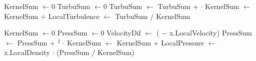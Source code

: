 \begin{center}
\begin{algorithmic}[1]
    \State KernelSum $\gets 0$
    \State TurbuSum $\gets 0$
        \State TurbuSum $\gets$ TurbuSum $+$  $\cdot$ 
        \State KernelSum $\gets$ KernelSum $+$ 
    \EndFor
    \State LocalTurbulence $\gets$ TurbuSum $/$ KernelSum
\EndFor

    \State KernelSum $\gets 0$
    \State PressSum $\gets 0$
        \State VelocityDif $\gets$ ( $-$ x.LocalVelocity)
        \State PressSum $\gets$ PressSum $+$ $^2$ $\cdot$ 
        \State KernelSum $\gets$ KernelSum $+$ 
    \EndFor
    \State LocalPressure $\gets$ x.LocalDensity $\cdot$ (PressSum $/$ KernelSum)
\EndFor
\EndFunction


\end{algorithmic}

\end{center}